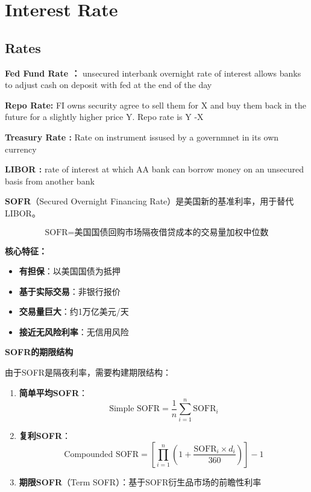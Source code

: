 \chapter{Interest Rate}

\section{Rates}

\textbf{Fed Fund Rate ：}
unsecured interbank overnight rate of interest allows banks to adjust cash on deposit with fed at the end of the day

\textbf{Repo Rate:}
FI owns security agree to sell them for X and buy them back in the future for a slightly higher price Y. Repo rate is Y -X

\textbf{Treasury Rate :}
Rate on instrument issused by a governmnet in its own currency

\textbf{LIBOR :}
rate of interest at which AA bank can borrow money on an unsecured basis from another bank

\textbf{SOFR}（Secured Overnight Financing Rate）是美国新的基准利率，用于替代LIBOR。

\begin{equation}
\text{SOFR} = \text{美国国债回购市场隔夜借贷成本的交易量加权中位数}
\end{equation}

\textbf{核心特征：}
\begin{itemize}
    \item \textbf{有担保}：以美国国债为抵押
    \item \textbf{基于实际交易}：非银行报价
    \item \textbf{交易量巨大}：约1万亿美元/天
    \item \textbf{接近无风险利率}：无信用风险
\end{itemize}


\textbf{SOFR的期限结构}

由于SOFR是隔夜利率，需要构建期限结构：

\begin{enumerate}
    \item \textbf{简单平均SOFR}：
    \begin{equation}
    \text{Simple SOFR} = \frac{1}{n}\sum_{i=1}^{n} \text{SOFR}_i
    \end{equation}
    
    \item \textbf{复利SOFR}：
    \begin{equation}
    \text{Compounded SOFR} = \left[\prod_{i=1}^{n}\left(1 + \frac{\text{SOFR}_i \times d_i}{360}\right)\right] - 1
    \end{equation}
    
    \item \textbf{期限SOFR}（Term SOFR）：基于SOFR衍生品市场的前瞻性利率
\end{enumerate}


